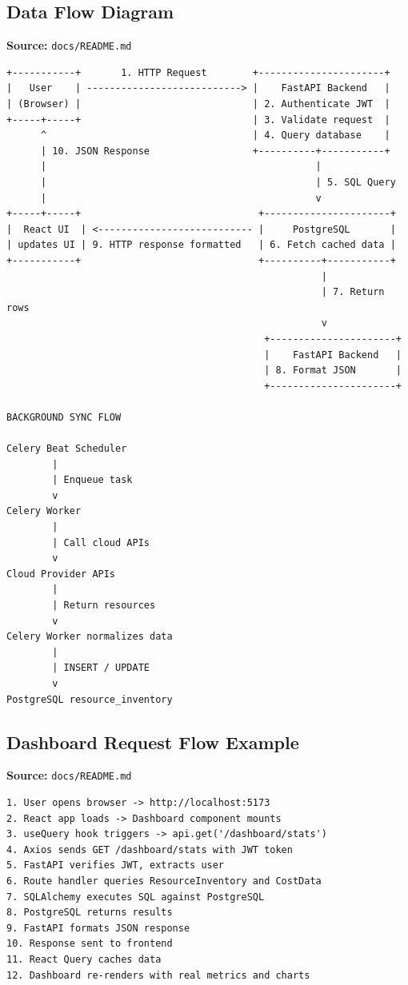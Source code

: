 \subsection{Data Flow Diagram}
\textbf{Source:} \texttt{docs/README.md}
\begin{lstlisting}[numbers=none,basicstyle=\ttfamily\tiny,caption={Data Flow Diagram Adapted from docs/README.md}]
+-----------+       1. HTTP Request        +----------------------+
|   User    | ---------------------------> |    FastAPI Backend   |
| (Browser) |                              | 2. Authenticate JWT  |
+-----+-----+                              | 3. Validate request  |
      ^                                    | 4. Query database    |
      | 10. JSON Response                  +----------+-----------+
      |                                               |
      |                                               | 5. SQL Query
      |                                               v
+-----+-----+                               +----------------------+
|  React UI  | <--------------------------- |     PostgreSQL       |
| updates UI | 9. HTTP response formatted   | 6. Fetch cached data |
+-----------+                               +----------+-----------+
                                                       |
                                                       | 7. Return rows
                                                       v
                                             +----------------------+
                                             |    FastAPI Backend   |
                                             | 8. Format JSON       |
                                             +----------------------+

BACKGROUND SYNC FLOW

Celery Beat Scheduler
        |
        | Enqueue task
        v
Celery Worker
        |
        | Call cloud APIs
        v
Cloud Provider APIs
        |
        | Return resources
        v
Celery Worker normalizes data
        |
        | INSERT / UPDATE
        v
PostgreSQL resource_inventory
\end{lstlisting}


\subsection{Dashboard Request Flow Example}
\textbf{Source:} \texttt{docs/README.md}
\begin{lstlisting}[numbers=none,basicstyle=\ttfamily\tiny,caption={Dashboard Request Flow Adapted from docs/README.md}]
1. User opens browser -> http://localhost:5173
2. React app loads -> Dashboard component mounts
3. useQuery hook triggers -> api.get('/dashboard/stats')
4. Axios sends GET /dashboard/stats with JWT token
5. FastAPI verifies JWT, extracts user
6. Route handler queries ResourceInventory and CostData
7. SQLAlchemy executes SQL against PostgreSQL
8. PostgreSQL returns results
9. FastAPI formats JSON response
10. Response sent to frontend
11. React Query caches data
12. Dashboard re-renders with real metrics and charts
\end{lstlisting}

